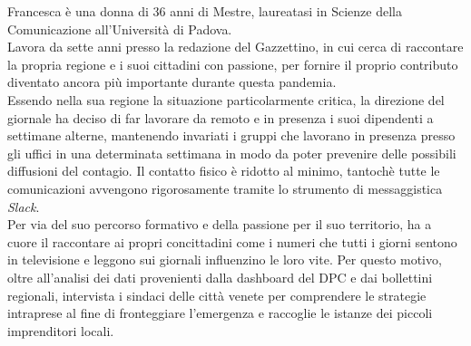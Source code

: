 Francesca è una donna di 36 anni di Mestre, laureatasi in Scienze della Comunicazione all'Università di Padova.\\ 
Lavora da sette anni presso la redazione del Gazzettino, in cui cerca di raccontare la propria regione e i suoi cittadini con passione, per fornire il proprio contributo diventato ancora più importante durante questa pandemia.\\ 
Essendo nella sua regione la situazione particolarmente critica, la direzione del giornale ha deciso di far lavorare da remoto e in presenza i suoi dipendenti a settimane alterne, mantenendo invariati i gruppi che lavorano in presenza presso gli uffici in una determinata settimana in modo da poter prevenire delle possibili diffusioni del contagio. Il contatto fisico è ridotto al minimo, tantochè tutte le comunicazioni avvengono rigorosamente tramite lo strumento di messaggistica \textit{Slack}.\\ 
Per via del suo percorso formativo e della passione per il suo territorio, ha a cuore il raccontare ai propri concittadini come i numeri che tutti i giorni sentono in televisione e leggono sui giornali influenzino le loro vite. Per questo motivo, oltre all'analisi dei dati provenienti dalla dashboard del DPC e dai bollettini regionali, intervista i sindaci delle città venete per comprendere le strategie intraprese al fine di fronteggiare l'emergenza e raccoglie le istanze dei piccoli imprenditori locali.

